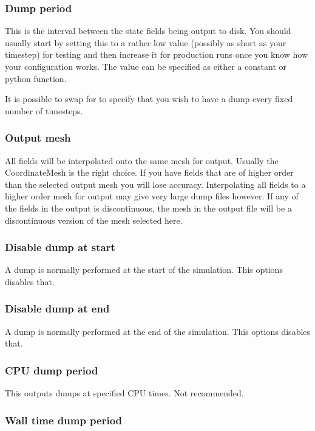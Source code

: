 \subsubsection{Dump period}
This is the interval between the state fields being output to disk. You should usually start by setting this to a rather low value (possibly as short as your timestep) for testing and then increase it for production runs once you know how your configuration works. The value can be specified as either a constant or python function.

It is possible to swap  for  to specify that you wish to have a dump every fixed number of timesteps.

\subsubsection{Output mesh}

All fields will be interpolated onto the same mesh for output. Usually the
CoordinateMesh is the right choice. If you have fields that are of
higher order than the selected output mesh you will lose 
accuracy. Interpolating all fields to a higher order mesh for output may give
very large dump files however. If any 
of the fields in the output is discontinuous, the mesh in the output file
will be a discontinuous version of the mesh selected here.

\subsubsection{Disable dump at start}

A dump is normally performed at the start of the simulation. This options disables that.

\subsubsection{Disable dump at end}

A dump is normally performed at the end of the simulation. This options disables that.

\subsubsection{CPU dump period}

This outputs dumps at specified CPU times. Not recommended.

\subsubsection{Wall time dump period}

